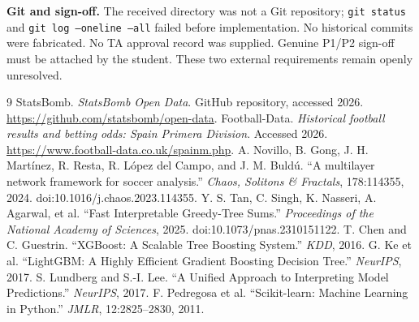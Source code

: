 \documentclass[10pt]{article}
\begin{document}
\textbf{Git and sign-off.} The received directory was not a Git repository; \texttt{git status} and \texttt{git log --oneline --all} failed before implementation. No historical commits were fabricated. No TA approval record was supplied. Genuine P1/P2 sign-off must be attached by the student. These two external requirements remain openly unresolved.

\begin{thebibliography}{9}
 StatsBomb. \emph{StatsBomb Open Data}. GitHub repository, accessed 2026. \url{https://github.com/statsbomb/open-data}.
 Football-Data. \emph{Historical football results and betting odds: Spain Primera Division}. Accessed 2026. \url{https://www.football-data.co.uk/spainm.php}.
 A. Novillo, B. Gong, J. H. Mart\'inez, R. Resta, R. L\'opez del Campo, and J. M. Buld\'u. ``A multilayer network framework for soccer analysis.'' \emph{Chaos, Solitons \& Fractals}, 178:114355, 2024. doi:10.1016/j.chaos.2023.114355.
 Y. S. Tan, C. Singh, K. Nasseri, A. Agarwal, et al. ``Fast Interpretable Greedy-Tree Sums.'' \emph{Proceedings of the National Academy of Sciences}, 2025. doi:10.1073/pnas.2310151122.
 T. Chen and C. Guestrin. ``XGBoost: A Scalable Tree Boosting System.'' \emph{KDD}, 2016.
 G. Ke et al. ``LightGBM: A Highly Efficient Gradient Boosting Decision Tree.'' \emph{NeurIPS}, 2017.
 S. Lundberg and S.-I. Lee. ``A Unified Approach to Interpreting Model Predictions.'' \emph{NeurIPS}, 2017.
 F. Pedregosa et al. ``Scikit-learn: Machine Learning in Python.'' \emph{JMLR}, 12:2825--2830, 2011.
\end{thebibliography}
\end{document}
